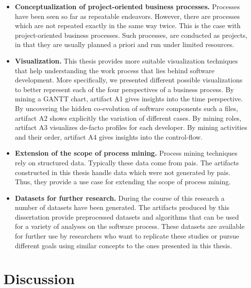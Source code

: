 \begin{itemize}
	
	\item \textbf{Conceptualization of project-oriented business processes.} Processes have been seen so far as repeatable endeavors. However, there are processes which are not repeated exactly in the same way twice. This is the case with project-oriented business processes. Such processes, are conducted as projects, in that they are usually planned a priori and run under limited resources. 
	
	\item \textbf{Visualization.} This thesis provides more suitable visualization techniques that help understanding the work process that lies behind software development. More specifically, we presented different possible visualizations to better represent each of the four perspectives of a business process. By mining a GANTT chart, artifact A1 gives insights into the time perspective. By uncovering the hidden co-evolution of software components such a files, artifact A2 shows explicitly the variation of different cases. By mining roles, artifact A3 visualizes de-facto profiles for each developer. By mining activities and their order, artifact A4 gives insights into the control-flow. 
	
	\item \textbf{Extension of the scope of process mining.} Process mining techniques rely on structured data. Typically these data come from \gls{pais}. The artifacts constructed in this thesis handle data which were not generated by \gls{pais}. Thus, they provide a use case for extending the scope of process mining. 
	
	\item \textbf{Datasets for further research.} During the course of this research a number of datasets have been generated. The artifacts produced by this dissertation provide preprocessed datasets and algorithms that can be used for a variety of analyses on the software process. These datasets are available for further use by researchers who want to replicate these studies or pursue different goals using similar concepts to the ones presented in this thesis. 
	
\end{itemize}


\section{Discussion} 
\label{sec:8-discussion}

